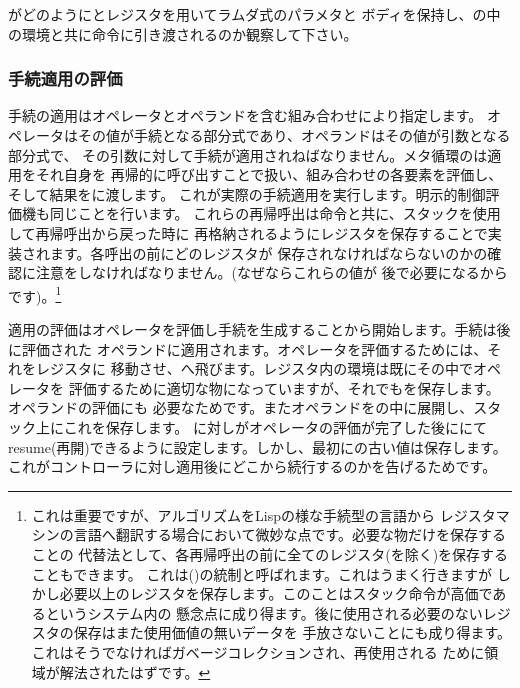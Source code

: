 \noindent
{}がどのようにとレジスタを用いてラムダ式のパラメタと
ボディを保持し、の中の環境と共に命令に引き渡されるのか観察して下さい。

\subsubsection*{手続適用の評価}

手続の適用はオペレータとオペランドを含む組み合わせにより指定します。
オペレータはその値が手続となる部分式であり、オペランドはその値が引数となる部分式で、
その引数に対して手続が適用されねばなりません。メタ循環のは適用をそれ自身を
再帰的に呼び出すことで扱い、組み合わせの各要素を評価し、そして結果をに渡します。
これが実際の手続適用を実行します。明示的制御評価機も同じことを行います。
これらの再帰呼出は命令と共に、スタックを使用して再帰呼出から戻った時に
再格納されるようにレジスタを保存することで実装されます。各呼出の前にどのレジスタが
保存されなければならないのかの確認に注意をしなければなりません。(なぜならこれらの値が
後で必要になるからです)。\footnote{これは重要ですが、アルゴリズムをLispの様な手続型の言語から
レジスタマシンの言語へ翻訳する場合において微妙な点です。必要な物だけを保存することの
代替法として、各再帰呼出の前に全てのレジスタ(を除く)を保存することもできます。
これは()の統制と呼ばれます。これはうまく行きますが
しかし必要以上のレジスタを保存します。このことはスタック命令が高価であるというシステム内の
懸念点に成り得ます。後に使用される必要のないレジスタの保存はまた使用価値の無いデータを
手放さないことにも成り得ます。これはそうでなければガベージコレクションされ、再使用される
ために領域が解法されたはずです。}

適用の評価はオペレータを評価し手続を生成することから開始します。手続は後に評価された
オペランドに適用されます。オペレータを評価するためには、それをレジスタに
移動させ、へ飛びます。レジスタ内の環境は既にその中でオペレータを
評価するために適切な物になっていますが、それでもを保存します。オペランドの評価にも
必要なためです。またオペランドをの中に展開し、スタック上にこれを保存します。
に対しがオペレータの評価が完了した後ににて
resume(再開)できるように設定します。しかし、最初にの古い値は保存します。
これがコントローラに対し適用後にどこから続行するのかを告げるためです。

